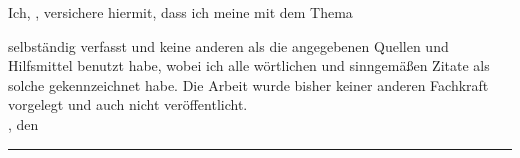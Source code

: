 \clearpage
{}


Ich, \autorName, versichere hiermit, dass ich meine \textbf{\betreff} mit dem
Thema
\begin{quote}
\textit{\titelOne{} \titelTwo{} \untertitelOne{} \untertitelTwo}
\end{quote}
selbständig verfasst und keine anderen als die angegebenen Quellen und Hilfsmittel benutzt habe,
wobei ich alle wörtlichen und sinngemäßen Zitate als solche gekennzeichnet habe. Die Arbeit
wurde bisher keiner anderen Fachkraft vorgelegt und auch nicht veröffentlicht.\\[6ex]




\abgabeOrt, den \abgabeTermin


\rule[-0.2cm]{4cm}{0.5pt}

\textsc{\autorName}